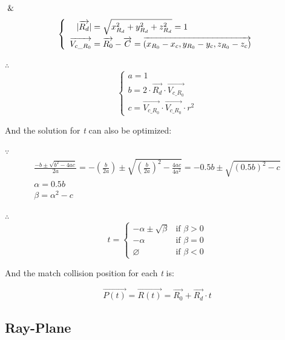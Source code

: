 $\And$
\[
\left\{
\begin{array}{lr}
\begin{aligned}
\lvert \overrightarrow{R_{d}} \rvert &= \sqrt{x_{R_{d}}^2 + y_{R_{d}}^2 + z_{R_{d}}^2} = 1 \\
\overrightarrow{V_{c\_R_{0}}} &= \overrightarrow{R_{0}} - \overrightarrow{C} = \overrightarrow{(x_{R_{0}} - x_{c}, y_{R_{0}} - y_{c}, z_{R_{0}} - z_{c})}
\end{aligned}
\end{array}
\right.
\]

$\therefore$
\[
\left\{
\begin{array}{lr}
a =1 \\
b = 2 \cdot \overrightarrow{R_{d}} \cdot \overrightarrow{V_{c\_R_{0}}} \\
c = \overrightarrow{V_{c\_R_{0}}} \cdot \overrightarrow{V_{c\_R_{0}}} \cdot r^2
\end{array}
\right.
\]

And the solution for \emph{t} can also be optimized:

$\because$
\[
\begin{array}{lr}
\frac{-b \pm \sqrt{b^2 - 4ac}}{2a} = -(\frac{b}{2a}) \pm \sqrt{(\frac{b}{2a})^2 - \frac{4ac}{4a^2}} = -0.5b \pm \sqrt{(0.5b)^2 - c} \\
\alpha = 0.5b \\
\beta = \alpha^2 - c
\end{array}
\]

$\therefore$
\[
t =
\begin{cases}
 -\alpha \pm \sqrt{\beta} & \text{if } \beta > 0 \\
-\alpha & \text{if } \beta = 0 \\
\varnothing & \text{if } \beta < 0
\end{cases}
\]

And the match collision position for each \emph{t} is:

\begin{equation}\label{equ:ray-sphere-intersection}
\overrightarrow{P(t)} = \overrightarrow{R(t)} = \overrightarrow{R_{0}} + \overrightarrow{R_{d}} \cdot t
\end{equation}

\subsection{Ray-Plane}

